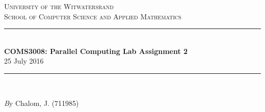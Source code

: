 \documentclass[11pt]{article}
\begin{document}
\begin{page}

\newcommand{\HRule}{\rule{\linewidth}{0.3mm}} %
\renewcommand\section{\@startsection{section}{1}{\z@}%
                                  {-3.5ex \@plus -1ex \@minus -.2ex}%
                                  {2.3ex \@plus.2ex}%
                                  {\normalfont\large\bfseries}}
\setlength{\parindent}{0pt}

\center %
 

\textsc{\LARGE University of the Witwatersrand}\\[1.5cm] %
\textsc{\Large School of Computer Science and Applied Mathematics}\\[0.5cm] %


\HRule \\[0.4cm]
{ \huge \bfseries COMS3008: Parallel Computing Lab Assignment 2}\\[0.4cm] %
  \large 25 July 2016
\HRule \\[1.5cm]
 
\begin{minipage}{1\textwidth}
  \Large \emph By Chalom, J. (711985)\\
\end{minipage}


\vfill %

\end{page}
\end{document}
